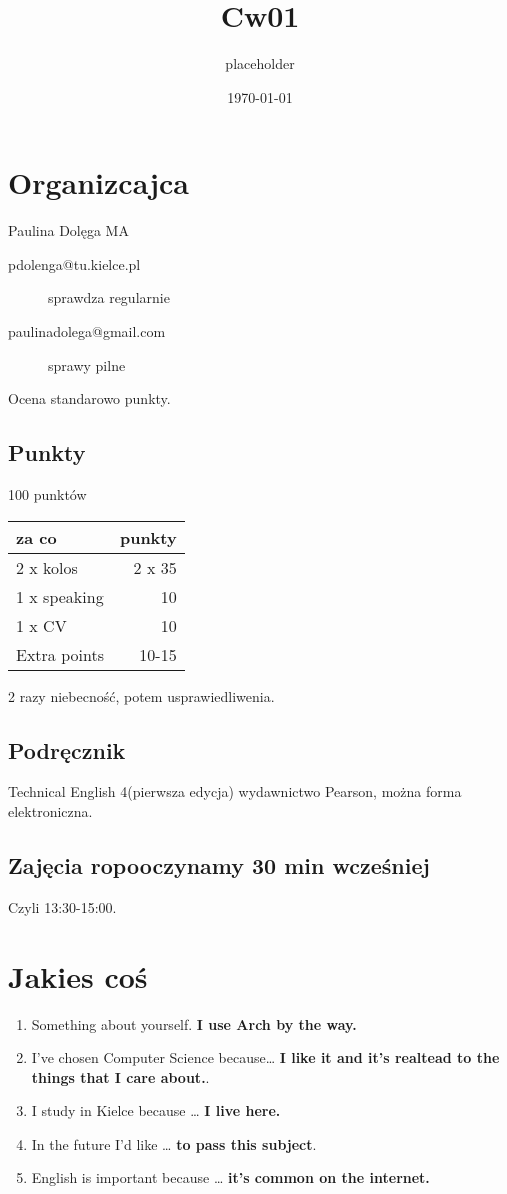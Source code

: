 \documentclass[11pt]{article}
\author{placeholder}
\date{\today}
\title{Cw01}
\begin{document}
\maketitle
\tableofcontents


\section{Organizcajca}
\label{sec:org66597cd}
Paulina Dolęga MA
\begin{description}
\item[{pdolenga@tu.kielce.pl}] sprawdza regularnie
\item[{paulinadolega@gmail.com}] sprawy pilne
\end{description}
Ocena standarowo punkty.
\subsection{Punkty}
\label{sec:orge1977d8}
100 punktów
\begin{center}
\begin{tabular}{lr}
za co & punkty\\[0pt]
\hline
2 x kolos & 2 x 35\\[0pt]
1 x speaking & 10\\[0pt]
1 x CV & 10\\[0pt]
Extra points & 10-15\\[0pt]
\end{tabular}
\end{center}

2 razy niebecność, potem usprawiedliwenia.
\subsection{Podręcznik}
\label{sec:orgeb7917f}
Technical English 4(pierwsza edycja) wydawnictwo Pearson, można forma elektroniczna.
\subsection{Zajęcia ropooczynamy 30 min wcześniej}
\label{sec:org644b4fc}
Czyli 13:30-15:00.
\section{Jakies coś}
\label{sec:org992695b}
\begin{enumerate}
\item Something about yourself. \textbf{I use Arch by the way.}
\item I've chosen Computer Science because\ldots{} \textbf{I like it and it's realtead to the things that I care about.}.
\item I study in Kielce because \ldots{} \textbf{I live here.}
\item In the future I'd like \ldots{} \textbf{to pass this subject}.
\item English is important because \ldots{} \textbf{it's common on the internet.}
\end{enumerate}
\end{document}
